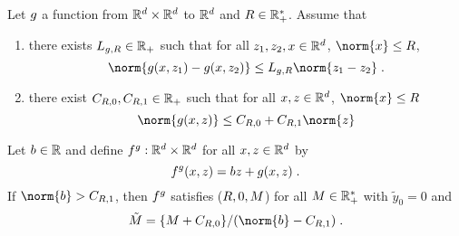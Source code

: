 \begin{proposition}\label{le:degree_application}
Let  $g$ a function from $ \mathbb{R}^d\times \mathbb{R}^d$ to $\mathbb{R}^d$ and $R \in \mathbb{R}^{*}_+$. Assume that
\begin{enumerate}[label=(\roman*)]
\item
\label{propo:irred_b_item_i}
 there exists $L_{g,R} \in \mathbb{R}_+$  such that for all $z_1,z_2,x \in \mathbb{R}^d$, $\norm{x} \leq \ra$,
  \begin{equation}
    \label{eq:5}
    \norm{g(x,z_1) - g(x,z_2)} \leq \lipgr\norm{z_1-z_2} \eqsp.
  \end{equation}
\item
\label{propo:irred_b_item_ii}
there exist $ C_{R,0} , C_{R,1}
\in \mathbb{R}_+$ such that for all $x,z \in \mathbb{R}^d$, $\norm{x} \leq \ra$
\begin{equation}
  \label{eq:4}
\norm{g(x,z)} \leq  \Cga_{\ra,0} +   \Cga_{\ra,1} \norm{z}
\end{equation}
\end{enumerate}

Let $b \in \mathbb{R}$ and define $f^{g} : \mathbb{R}^d \times \mathbb{R}^d$ for all $x,z \in \mathbb{R}^d$ by
\begin{equation}
  f^{g}(x,z) =  b z + g(x,z) \;.
\end{equation}
If $\norm{\bg} > \Cga_{\ra,1} $, then $f^{g}$ satisfies ($R,0,M$) for all $M \in \mathbb{R}_+^*$ with $\tilde{y}_0=0$ and 
\begin{equation}
  \label{eq:deftildeM}
\tilde{M} = \{M  + \Cga_{\ra,0} \}/(\norm{\bg}-\Cga_{\ra,1} ) \eqsp.
\end{equation}
\end{proposition}


